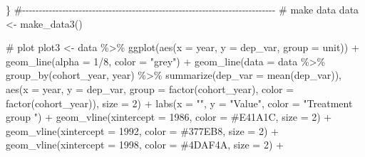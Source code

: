 \documentclass[
  letterpaper,
  DIV=11,
  numbers=noendperiod]{scrartcl}
\newenvironment{Shaded}{\begin{snugshade}}{\end{snugshade}}
\newcommand{\AttributeTok}[1]{\textcolor[rgb]{0.40,0.45,0.13}{#1}}
\newcommand{\CommentTok}[1]{\textcolor[rgb]{0.37,0.37,0.37}{#1}}
\newcommand{\DecValTok}[1]{\textcolor[rgb]{0.68,0.00,0.00}{#1}}
\newcommand{\FunctionTok}[1]{\textcolor[rgb]{0.28,0.35,0.67}{#1}}
\newcommand{\NormalTok}[1]{\textcolor[rgb]{0.00,0.23,0.31}{#1}}
\newcommand{\OtherTok}[1]{\textcolor[rgb]{0.00,0.23,0.31}{#1}}
\newcommand{\SpecialCharTok}[1]{\textcolor[rgb]{0.37,0.37,0.37}{#1}}
\newcommand{\StringTok}[1]{\textcolor[rgb]{0.13,0.47,0.30}{#1}}
\begin{document}
\begin{Shaded}
\begin{Highlighting}[]
\NormalTok{\}}
\CommentTok{\#{-}{-}{-}{-}{-}{-}{-}{-}{-}{-}{-}{-}{-}{-}{-}{-}{-}{-}{-}{-}{-}{-}{-}{-}{-}{-}{-}{-}{-}{-}{-}{-}{-}{-}{-}{-}{-}{-}{-}{-}{-}{-}{-}{-}{-}{-}{-}{-}{-}{-}{-}{-}{-}{-}{-}{-}{-}{-}{-}{-}{-}{-}{-}{-}{-}{-}{-}{-}{-}{-}{-}{-}{-}{-}{-}{-}}
\CommentTok{\# make data}
\NormalTok{data }\OtherTok{\textless{}{-}} \FunctionTok{make\_data3}\NormalTok{()}

\CommentTok{\# plot}
\NormalTok{plot3 }\OtherTok{\textless{}{-}}\NormalTok{ data }\SpecialCharTok{\%\textgreater{}\%} 
  \FunctionTok{ggplot}\NormalTok{(}\FunctionTok{aes}\NormalTok{(}\AttributeTok{x =}\NormalTok{ year, }\AttributeTok{y =}\NormalTok{ dep\_var, }\AttributeTok{group =}\NormalTok{ unit)) }\SpecialCharTok{+} 
  \FunctionTok{geom\_line}\NormalTok{(}\AttributeTok{alpha =} \DecValTok{1}\SpecialCharTok{/}\DecValTok{8}\NormalTok{, }\AttributeTok{color =} \StringTok{"grey"}\NormalTok{) }\SpecialCharTok{+} 
  \FunctionTok{geom\_line}\NormalTok{(}\AttributeTok{data =}\NormalTok{ data }\SpecialCharTok{\%\textgreater{}\%} 
              \FunctionTok{group\_by}\NormalTok{(cohort\_year, year) }\SpecialCharTok{\%\textgreater{}\%} 
              \FunctionTok{summarize}\NormalTok{(}\AttributeTok{dep\_var =} \FunctionTok{mean}\NormalTok{(dep\_var)),}
            \FunctionTok{aes}\NormalTok{(}\AttributeTok{x =}\NormalTok{ year, }\AttributeTok{y =}\NormalTok{ dep\_var, }\AttributeTok{group =} \FunctionTok{factor}\NormalTok{(cohort\_year),}
                \AttributeTok{color =} \FunctionTok{factor}\NormalTok{(cohort\_year)),}
            \AttributeTok{size =} \DecValTok{2}\NormalTok{) }\SpecialCharTok{+} 
  \FunctionTok{labs}\NormalTok{(}\AttributeTok{x =} \StringTok{""}\NormalTok{, }\AttributeTok{y =} \StringTok{"Value"}\NormalTok{,  }\AttributeTok{color =} \StringTok{"Treatment group   "}\NormalTok{) }\SpecialCharTok{+} 
  \FunctionTok{geom\_vline}\NormalTok{(}\AttributeTok{xintercept =} \DecValTok{1986}\NormalTok{, }\AttributeTok{color =} \StringTok{\textquotesingle{}\#E41A1C\textquotesingle{}}\NormalTok{, }\AttributeTok{size =} \DecValTok{2}\NormalTok{) }\SpecialCharTok{+} 
  \FunctionTok{geom\_vline}\NormalTok{(}\AttributeTok{xintercept =} \DecValTok{1992}\NormalTok{, }\AttributeTok{color =} \StringTok{\textquotesingle{}\#377EB8\textquotesingle{}}\NormalTok{, }\AttributeTok{size =} \DecValTok{2}\NormalTok{) }\SpecialCharTok{+} 
  \FunctionTok{geom\_vline}\NormalTok{(}\AttributeTok{xintercept =} \DecValTok{1998}\NormalTok{, }\AttributeTok{color =} \StringTok{\textquotesingle{}\#4DAF4A\textquotesingle{}}\NormalTok{, }\AttributeTok{size =} \DecValTok{2}\NormalTok{) }\SpecialCharTok{+} 

\end{Highlighting}
\end{Shaded}
\end{document}
